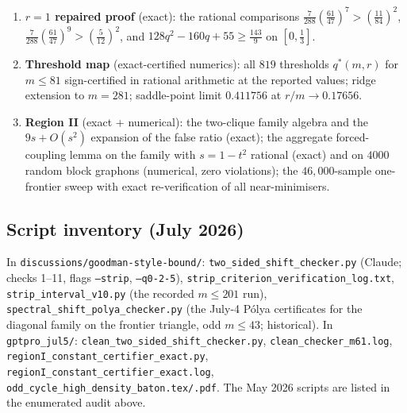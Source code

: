 \documentclass[11pt]{article}
\begin{document}
\begin{enumerate}[label=\textup{(\arabic*)},resume]
    Claude's independent audit (July 5) additionally: re-verified the
    appendix polynomial facts by Sturm root counts (the quartic numerator of
    the $B_0$-monotonicity claim has no roots in $[4,8]$; the cubic
    $2/3-2\theta-51\theta(1/2-2\theta)^2$ has no roots in $(0,1/6]$; the
    $P\ge72$ factorisation is an exact identity; $B_0(1/6)>201/200$ reduces
    to $800^3>201^3\cdot63$), and stress-tested all three tail lemmas at
    $1{,}754$ random points in their case regions (log-space quadrature; zero
    violations of the deficit bound, the surplus bound, their comparison, and
    the pointwise upper-reflection condition).
    \item \textbf{$r=1$ repaired proof} (exact): the rational comparisons
    $\tfrac{7}{288}(\tfrac{61}{47})^7>(\tfrac{11}{84})^2$,
    $\tfrac{7}{288}(\tfrac{61}{47})^9>(\tfrac5{12})^2$, and
    $128q^2-160q+55\ge\tfrac{143}9$ on $[0,\tfrac13]$.
    \item \textbf{Threshold map} (exact-certified numerics): all $819$
    thresholds $q^*(m,r)$ for $m\le81$ sign-certified in rational arithmetic
    at the reported values; ridge extension to $m=281$; saddle-point limit
    $0.411756$ at $r/m\to0.17656$.
    \item \textbf{Region II} (exact + numerical): the two-clique family
    algebra and the $9s+O(s^2)$ expansion of the false ratio (exact); the
    aggregate forced-coupling lemma on the family with $s=1-t^2$ rational
    (exact) and on $4000$ random block graphons (numerical, zero violations);
    the $46{,}000$-sample one-frontier sweep with exact re-verification of
    all near-minimisers.
\end{enumerate}

\subsection*{Script inventory (July 2026)}

In \texttt{discussions/goodman-style-bound/}:
\texttt{two\_sided\_shift\_checker.py} (Claude; checks 1--11, flags
\texttt{--strip}, \texttt{--q0-2-5}),
\texttt{strip\_criterion\_verification\_log.txt},
\texttt{strip\_interval\_v10.py} (the recorded $m\le201$ run),
\texttt{spectral\_shift\_polya\_checker.py} (the July-4 P\'olya certificates
for the diagonal family on the frontier triangle, odd $m\le43$; historical).
In \texttt{gptpro\_jul5/}:
\texttt{clean\_two\_sided\_shift\_checker.py},
\texttt{clean\_checker\_m61.log},
\texttt{regionI\_constant\_certifier\_exact.py},
\texttt{regionI\_constant\_certifier\_exact.log},
\texttt{odd\_cycle\_high\_density\_baton.tex/.pdf}.
The May 2026 scripts are listed in the enumerated audit above.
\end{document}
